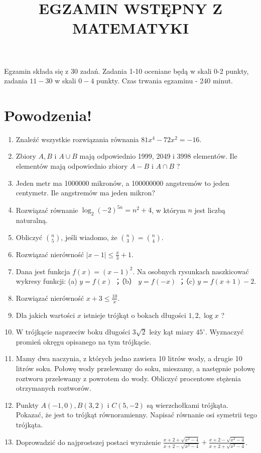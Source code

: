 \documentclass[10pt]{article}
\title{EGZAMIN WSTĘPNY Z MATEMATYKI }
\author{}
\date{}
\begin{document}
\maketitle
Egzamin składa się z 30 zadań. Zadania 1-10 oceniane będą w skali 0-2 punkty, zadania \(11-30\) w skali \(0-4\) punkty. Czas trwania egzaminu - 240 minut.

\section*{Powodzenia!}
\begin{enumerate}
  \item Znaleźć wszystkie rozwiązania równania \(81 x^{4}-72 x^{2}=-16\).
  \item Zbiory \(A, B\) i \(A \cup B\) mają odpowiednio 1999, 2049 i 3998 elementów. Ile elementów mają odpowiednio zbiory \(A-B\) i \(A \cap B\) ?
  \item Jeden metr ma 1000000 mikronów, a 100000000 angstremów to jeden centymetr. Ile angstremów ma jeden mikron?
  \item Rozwiązać równanie \(\log _{2}(-2)^{5 n}=n^{2}+4\), w którym \(n\) jest liczbą naturalną.
  \item Obliczyć \(\binom{n}{5}\), jeśli wiadomo, że \(\binom{n}{3}=\binom{n}{4}\).
  \item Rozwiązać nierówność \(|x-1| \leqslant \frac{x}{3}+1\).
  \item Dana jest funkcja \(f(x)=(x-1)^{2}\). Na osobnych rysunkach naszkicować wykresy funkcji: (a) \(y=f(x)\) ；（b） \(y=f(-x)\) ；（c) \(y=f(x+1)-2\).
  \item Rozwiązać nierówność \(x+3 \leqslant \frac{10}{x}\).
  \item Dla jakich wartości \(x\) istnieje trójkąt o bokach długości \(1,2, \log x\) ?
  \item W trójkącie naprzeciw boku długości \(3 \sqrt{2}\) leży kąt miary \(45^{\circ}\). Wyznaczyć promień okręgu opisanego na tym trójkącie.
  \item Mamy dwa naczynia, z których jedno zawiera 10 litrów wody, a drugie 10 litrów soku. Połowę wody przelewamy do soku, mieszamy, a następnie połowę roztworu przelewamy z powrotem do wody. Obliczyć procentowe stężenia otrzymanych roztworów.
  \item Punkty \(A(-1,0), B(3,2)\) i \(C(5,-2)\) są wierzchołkami trójkąta. Pokazać, że jest to trójkąt równoramienny. Napisać równanie osi symetrii tego trójkąta.
  \item Doprowadzić do najprostszej postaci wyrażenie \(\frac{x+2+\sqrt{x^{2}-4}}{x+2-\sqrt{x^{2}-4}}+\frac{x+2-\sqrt{x^{2}-4}}{x+2+\sqrt{x^{2}-4}}\).

\end{enumerate}
\end{document}
